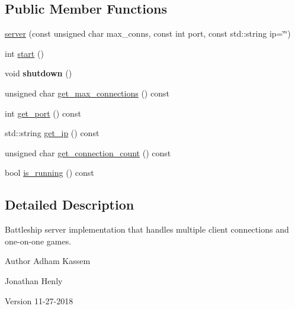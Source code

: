 \subsection*{Public Member Functions}
\begin{DoxyCompactItemize}
\item 
\hyperlink{classbattleship_1_1game__server_1_1server_a2701536460afe0c69a7472e563041f8a}{server} (const unsigned char max\+\_\+conns, const int port, const std\+::string ip=\char`\"{}\char`\"{})
\item 
int \hyperlink{classbattleship_1_1game__server_1_1server_a07a7f97a9b7a5c1bcb0a4730a5e92745}{start} ()
\item 
\mbox{\label{classbattleship_1_1game__server_1_1server_a396027c2491c294d4934037da1a27341}} 
void {\bfseries shutdown} ()
\item 
unsigned char \hyperlink{classbattleship_1_1game__server_1_1server_a654d346dfec64a6b0563337312f0ee37}{get\+\_\+max\+\_\+connections} () const
\item 
int \hyperlink{classbattleship_1_1game__server_1_1server_afdcbafb3a745a64dc3ca05d6f4589656}{get\+\_\+port} () const
\item 
std\+::string \hyperlink{classbattleship_1_1game__server_1_1server_a877b2f81e0bcd08311f1e7c1410c9de4}{get\+\_\+ip} () const
\item 
unsigned char \hyperlink{classbattleship_1_1game__server_1_1server_a935ce9f2b8c774ff4f3904aac5c09b91}{get\+\_\+connection\+\_\+count} () const
\item 
bool \hyperlink{classbattleship_1_1game__server_1_1server_a5d740941b4dd0bd5a1773ac623b72a84}{is\+\_\+running} () const
\end{DoxyCompactItemize}


\subsection{Detailed Description}
Battleship server implementation that handles multiple client connections and one-\/on-\/one games. 

\begin{DoxyAuthor}{Author}
Adham Kassem 

Jonathan Henly 
\end{DoxyAuthor}
\begin{DoxyVersion}{Version}
11-\/27-\/2018 
\end{DoxyVersion}


